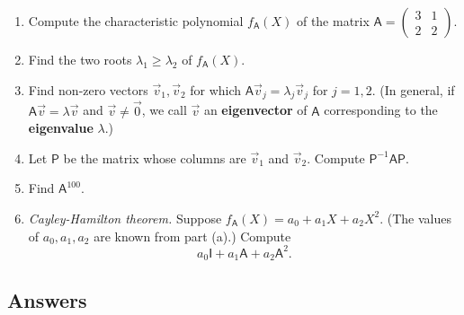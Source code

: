 \begin{enumerate}
\begin{enumerate}
\item Compute the characteristic polynomial $f_{\mathsf{A}}(X)$ of the matrix $\mathsf{A} = \begin{pmatrix} 3 & 1 \\ 2 & 2 \end{pmatrix}$.
\item Find the two roots $\lambda_1\geq\lambda_2$ of $f_{\mathsf{A}}(X)$.
\item Find non-zero vectors $\vec{v}_1,\vec{v}_2$ for which $\mathsf{A}\vec{v}_j = \lambda_j\vec{v}_j$ for $j = 1,2$. (In general, if $\mathsf{A}\vec{v} = \lambda\vec{v}$ and $\vec{v}\neq\vec{0}$, we call $\vec{v}$ an \textbf{eigenvector} of $\mathsf{A}$ corresponding to the \textbf{eigenvalue} $\lambda$.)
\item Let $\mathsf{P}$ be the matrix whose columns are $\vec{v}_1$ and $\vec{v}_2$. Compute $\mathsf{P}^{-1}\mathsf{AP}$.
\item Find $\mathsf{A}^{100}$.
\item \emph{Cayley-Hamilton theorem.} Suppose $f_{\mathsf{A}}(X) = a_0 + a_1X + a_2X^2$. (The values of $a_0, a_1, a_2$ are known from part (a).) Compute
\begin{equation*}
a_0\mathsf{I} + a_1\mathsf{A} + a_2\mathsf{A}^2.
\end{equation*}
\end{enumerate}
\end{enumerate}


\newpage
\subsection{Answers}

